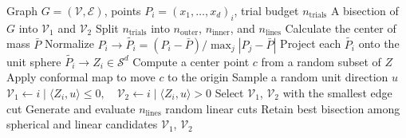 \begin{algorithm}
    \caption{Random sphere bisection.}
    \label{alg:sphere}
    \begin{algorithmic}[1]
        \Require Graph \( G = (\mathcal{V}, \mathcal{E}) \), points \( P_i = (x_{1}, \dots, x_{d})_i \), trial budget \(n_{\mathrm{trials}}\)
    \Ensure A bisection of \( G \) into \(\mathcal{V}_1\) and \(\mathcal{V}_2\)
        \State Split \(n_{\mathrm{trials}}\) into
            \(n_{\mathrm{outer}}\),
            \(n_{\mathrm{inner}}\),
            and \(n_{\mathrm{lines}}\)
        \State Calculate the center of mass \(\bar{P}\)
        \State Normalize \(P_i \rightarrow \tilde{P_i} = (P_i - \bar{P})/\max_j{|P_j - \bar{P}|}\)
        \State Project each \(\tilde{P_i}\) onto the unit sphere \(\tilde{P_i}\rightarrow Z_i \in \mathcal{S}^d\)
            \State Compute a center point \(c\) from a random subset of \(Z\)
            \State Apply conformal map to move \(c\) to the origin
                \State Sample a random unit direction \(u\)
                \State \(\mathcal{V}_1 \gets { i \mid \langle Z_i, u \rangle \leq 0 }, \quad \mathcal{V}_2 \gets { i \mid \langle Z_i, u \rangle > 0 } \)
                \State Select \(\mathcal{V}_1\), \(\mathcal{V}_2\) with the smallest edge cut
            \EndFor
        \EndFor
        \State Generate and evaluate \(n_{\mathrm{lines}}\) random linear cuts
        \State Retain best bisection among spherical and linear candidates 
        \State \Return \(\mathcal{V}_1\), \(\mathcal{V}_2\)
    \EndFunction
    \end{algorithmic}
\end{algorithm}